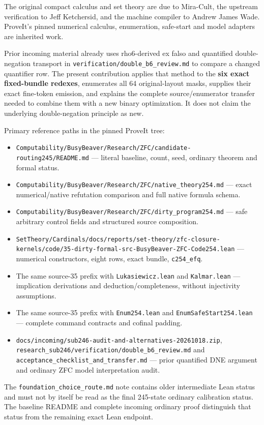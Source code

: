 The original compact calculus and set theory are due to Mira-Cult, the
upstream verification to Jeff Ketchersid, and the machine compiler to
Andrew James Wade. ProveIt's pinned numerical calculus, enumeration,
safe-start and model adapters are inherited work.

Prior incoming material already uses rho6-derived ex falso and
quantified double-negation transport in
\nolinkurl{verification/double_b6_review.md} to compare a changed
quantifier row. The present contribution applies that method to the
\textbf{six exact fixed-bundle redexes}, enumerates all 64
original-layout masks, supplies their exact fine-token emission, and
explains the complete source/enumerator transfer needed to combine them
with a new binary optimization. It does not claim the underlying
double-negation principle as new.

Primary reference paths in the pinned ProveIt tree:

\begin{itemize}
\tightlist
\item
  \nolinkurl{Computability/BusyBeaver/Research/ZFC/candidate-routing245/README.md}
  --- literal baseline, count, seed, ordinary theorem and formal status.
\item
  \nolinkurl{Computability/BusyBeaver/Research/ZFC/native_theory254.md}
  --- exact numerical/native refutation comparison and full native
  formula schema.
\item
  \nolinkurl{Computability/BusyBeaver/Research/ZFC/dirty_program254.md}
  --- safe arbitrary control fields and structured source composition.
\item
  \nolinkurl{SetTheory/Cardinals/docs/reports/set-theory/zfc-closure-kernels/code/35-dirty-formal-src-BusyBeaver-ZFC-Code254.lean}
  --- numerical constructors, eight rows, exact bundle,
  \texttt{c254\_efq}.
\item
  The same source-35 prefix with \texttt{Lukasiewicz.lean} and
  \texttt{Kalmar.lean} --- implication derivations and
  deduction/completeness, without injectivity assumptions.
\item
  The same source-35 prefix with \texttt{Enum254.lean} and
  \texttt{EnumSafeStart254.lean} --- complete command contracts and
  cofinal padding.
\item
  \nolinkurl{docs/incoming/sub246-audit-and-alternatives-20261018.zip},
  \nolinkurl{research_sub246/verification/double_b6_review.md} and
  \nolinkurl{acceptance_checklist_and_transfer.md} --- prior quantified
  DNE argument and ordinary ZFC model interpretation audit.
\end{itemize}

The \nolinkurl{foundation_choice_route.md} note contains older
intermediate Lean status and must not by itself be read as the final
245-state ordinary calibration status. The baseline README and complete
incoming ordinary proof distinguish that status from the remaining exact
Lean endpoint.
